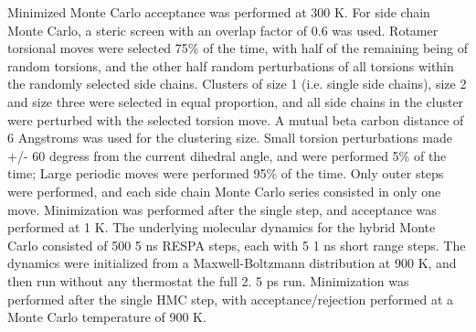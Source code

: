 Minimized Monte Carlo acceptance was performed at 300 K.
For side chain Monte Carlo, a steric screen with an overlap factor of 0.6 was used.
Rotamer torsional moves were selected 75\% of the time, with half of the remaining being of random torsions, and the other half random perturbations of all torsions within the randomly selected side chains.
Clusters of size 1 (i.e. single side chains), size 2 and size three were selected in equal proportion, and all side chains in the cluster were perturbed with the selected torsion move.
A mutual beta carbon distance of 6 Angstroms was used for the clustering size.
Small torsion perturbations made +/- 60 degress from the current dihedral angle, and were performed 5\% of the time; Large periodic moves were performed 95\% of the time.
Only outer steps were performed, and each side chain Monte Carlo series consisted in only one move.
Minimization was performed after the single step, and acceptance was performed at 1 K.
The underlying molecular dynamics for the hybrid Monte Carlo consisted of 500 5 ns RESPA steps, each with 5 1 ns short range steps.
The dynamics were initialized from a Maxwell-Boltzmann distribution at 900 K, and then run without any thermostat the full 2.
5 ps run.
Minimization was performed after the single HMC step, with acceptance/rejection performed at a Monte Carlo temperature of 900 K.

